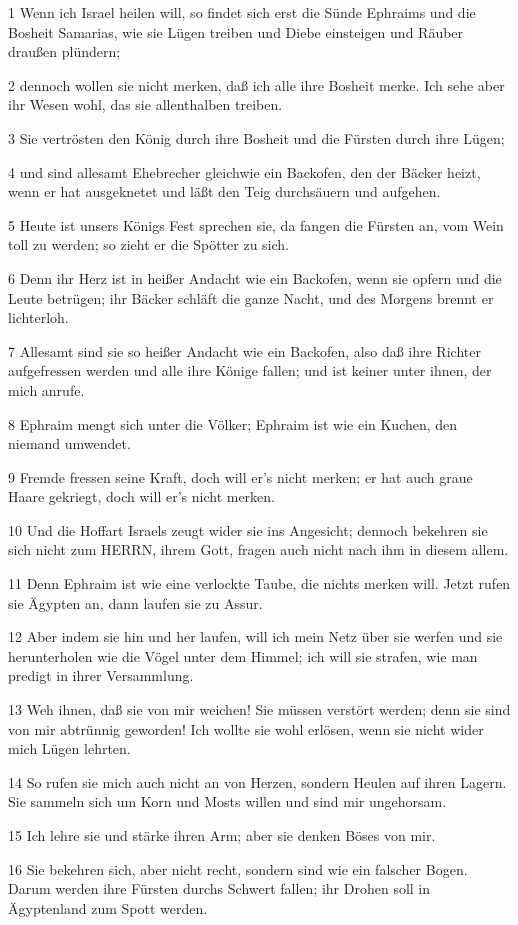 \par 1 Wenn ich Israel heilen will, so findet sich erst die Sünde Ephraims und die Bosheit Samarias, wie sie Lügen treiben und Diebe einsteigen und Räuber draußen plündern;
\par 2 dennoch wollen sie nicht merken, daß ich alle ihre Bosheit merke. Ich sehe aber ihr Wesen wohl, das sie allenthalben treiben.
\par 3 Sie vertrösten den König durch ihre Bosheit und die Fürsten durch ihre Lügen;
\par 4 und sind allesamt Ehebrecher gleichwie ein Backofen, den der Bäcker heizt, wenn er hat ausgeknetet und läßt den Teig durchsäuern und aufgehen.
\par 5 Heute ist unsers Königs Fest sprechen sie, da fangen die Fürsten an, vom Wein toll zu werden; so zieht er die Spötter zu sich.
\par 6 Denn ihr Herz ist in heißer Andacht wie ein Backofen, wenn sie opfern und die Leute betrügen; ihr Bäcker schläft die ganze Nacht, und des Morgens brennt er lichterloh.
\par 7 Allesamt sind sie so heißer Andacht wie ein Backofen, also daß ihre Richter aufgefressen werden und alle ihre Könige fallen; und ist keiner unter ihnen, der mich anrufe.
\par 8 Ephraim mengt sich unter die Völker; Ephraim ist wie ein Kuchen, den niemand umwendet.
\par 9 Fremde fressen seine Kraft, doch will er's nicht merken; er hat auch graue Haare gekriegt, doch will er's nicht merken.
\par 10 Und die Hoffart Israels zeugt wider sie ins Angesicht; dennoch bekehren sie sich nicht zum HERRN, ihrem Gott, fragen auch nicht nach ihm in diesem allem.
\par 11 Denn Ephraim ist wie eine verlockte Taube, die nichts merken will. Jetzt rufen sie Ägypten an, dann laufen sie zu Assur.
\par 12 Aber indem sie hin und her laufen, will ich mein Netz über sie werfen und sie herunterholen wie die Vögel unter dem Himmel; ich will sie strafen, wie man predigt in ihrer Versammlung.
\par 13 Weh ihnen, daß sie von mir weichen! Sie müssen verstört werden; denn sie sind von mir abtrünnig geworden! Ich wollte sie wohl erlösen, wenn sie nicht wider mich Lügen lehrten.
\par 14 So rufen sie mich auch nicht an von Herzen, sondern Heulen auf ihren Lagern. Sie sammeln sich um Korn und Mosts willen und sind mir ungehorsam.
\par 15 Ich lehre sie und stärke ihren Arm; aber sie denken Böses von mir.
\par 16 Sie bekehren sich, aber nicht recht, sondern sind wie ein falscher Bogen. Darum werden ihre Fürsten durchs Schwert fallen; ihr Drohen soll in Ägyptenland zum Spott werden.

